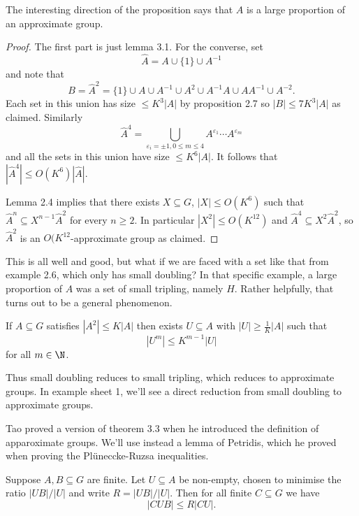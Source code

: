 \documentclass[a4paper]{article}
\begin{document}
The interesting direction of the proposition says that \(A\) is a large proportion of an approximate group.

\begin{proof}
  The first part is just lemma 3.1. For the converse, set
  \[
    \hat A = A \cup \{1\} \cup A^{-1}
  \]
  and note that
  \[
    B = \hat A^2 = \{1\} \cup A \cup A^{-1} \cup A^2 \cup A^{-1}A \cup AA^{-1} \cup A^{-2}.
  \]
  Each set in this union has size \(\leq K^3 |A|\) by proposition 2.7 so \(|B| \leq 7K^3|A|\) as claimed. Similarly
  \[
    \hat A^4 = \bigcup_{\varepsilon_i = \pm 1, 0 \leq m \leq 4} A^{\varepsilon_1} \cdots A^{\varepsilon_m}
  \]
  and all the sets in this union have size \(\leq K^6 |A|\). It follows that \(|\hat A^4| \leq O(K^6) |\hat A|\).

  Lemma 2.4 implies that there exists \(X \subseteq G\), \(|X| \leq O(K^6)\) such that \(\hat A^n \subseteq X^{n - 1} \hat A^2\) for every \(n \geq 2\). In particular \(|X^2| \leq O(K^{12})\) and \(\hat A^4 \subseteq X^2 \hat A^2\), so \(\hat A^2\) is an \(O(K^{12}\)-approximate group as claimed.
\end{proof}

This is all well and good, but what if we are faced with a set like that from example 2.6, which only has small doubling? In that specific example, a large proportion of \(A\) was a set of small tripling, namely \(H\). Rather helpfully, that turns out to be a general phenomenon.

\begin{theorem}[theorem 3.3]
  If \(A \subseteq G\) satisfies \(|A^2| \leq K|A|\) then exists \(U \subseteq A\) with \(|U| \geq \frac{1}{K}|A|\) such that
  \[
    |U^m| \leq K^{m - 1}|U|
  \]
  for all \(m \in \N\).
\end{theorem}

Thus small doubling reduces to small tripling, which reduces to approximate groups. In example sheet 1, we'll see a direct reduction from small doubling to approximate groups.

Tao proved a version of theorem 3.3 when he introduced the definition of apparoximate groups. We'll use instead a lemma of Petridis, which he proved when proving the Plüneccke-Ruzsa inequalities.

\begin{lemma}[lemma 3.4][Petridis]
  Suppose \(A, B \subseteq G\) are finite. Let \(U \subseteq A\) be non-empty, chosen to minimise the ratio \(|UB|/|U|\) and write \(R = |UB|/|U|\). Then for all finite \(C \subseteq G\) we have
  \[
    |CUB| \leq R |CU|.
  \]
\end{lemma}
\end{document}
